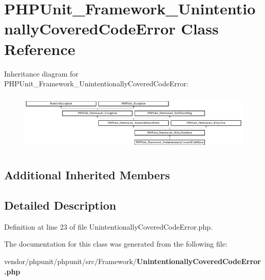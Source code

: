 \section{P\+H\+P\+Unit\+\_\+\+Framework\+\_\+\+Unintentionally\+Covered\+Code\+Error Class Reference}
\label{class_p_h_p_unit___framework___unintentionally_covered_code_error}
Inheritance diagram for P\+H\+P\+Unit\+\_\+\+Framework\+\_\+\+Unintentionally\+Covered\+Code\+Error\+:\begin{figure}[H]
\begin{center}
\leavevmode
\includegraphics[height=2.794411cm]{class_p_h_p_unit___framework___unintentionally_covered_code_error}
\end{center}
\end{figure}
\subsection*{Additional Inherited Members}


\subsection{Detailed Description}


Definition at line 23 of file Unintentionally\+Covered\+Code\+Error.\+php.



The documentation for this class was generated from the following file\+:\begin{DoxyCompactItemize}
\item 
vendor/phpunit/phpunit/src/\+Framework/{\bf Unintentionally\+Covered\+Code\+Error.\+php}\end{DoxyCompactItemize}
